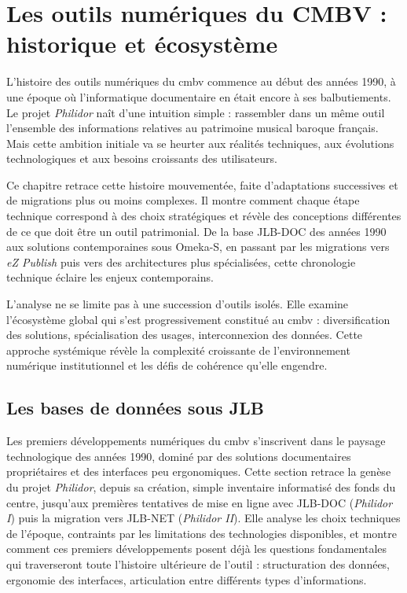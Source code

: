 \chapter[Les outils numériques du CMBV]{Les outils numériques du CMBV : historique et écosystème} \label{chap2}

L'histoire des outils numériques du \gls{cmbv} commence au début des années 1990, à une époque où l'informatique documentaire en était encore à ses balbutiements. Le projet \textit{Philidor} naît d'une intuition simple : rassembler dans un même outil l'ensemble des informations relatives au patrimoine musical baroque français. Mais cette ambition initiale va se heurter aux réalités techniques, aux évolutions technologiques et aux besoins croissants des utilisateurs.

Ce chapitre retrace cette histoire mouvementée, faite d'adaptations successives et de migrations plus ou moins complexes. Il montre comment chaque étape technique correspond à des choix stratégiques et révèle des conceptions différentes de ce que doit être un outil patrimonial. De la base JLB-DOC des années 1990 aux solutions contemporaines sous Omeka-S, en passant par les migrations vers \textit{eZ Publish} puis vers des architectures plus spécialisées, cette chronologie technique éclaire les enjeux contemporains.

L'analyse ne se limite pas à une succession d'outils isolés. Elle examine l'écosystème global qui s'est progressivement constitué au \gls{cmbv} : diversification des solutions, spécialisation des usages, interconnexion des données. Cette approche systémique révèle la complexité croissante de l'environnement numérique institutionnel et les défis de cohérence qu'elle engendre.

\section{Les bases de données sous JLB}

Les premiers développements numériques du \gls{cmbv} s'inscrivent dans le paysage technologique des années 1990, dominé par des solutions documentaires propriétaires et des interfaces peu ergonomiques. Cette section retrace la genèse du projet \textit{Philidor}, depuis sa création, simple inventaire informatisé des fonds du centre, jusqu'aux premières tentatives de mise en ligne avec JLB-DOC (\textit{Philidor I}) puis la migration vers JLB-NET (\textit{Philidor II}). Elle analyse les choix techniques de l'époque, contraints par les limitations des technologies disponibles, et montre comment ces premiers développements posent déjà les questions fondamentales qui traverseront toute l'histoire ultérieure de l'outil : structuration des données, ergonomie des interfaces, articulation entre différents types d'informations.

